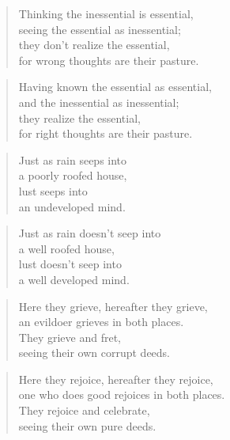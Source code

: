 \documentclass[12pt,openany]{book}%
\begin{document}
\begin{verse}%
Thinking the inessential is essential, \\
seeing the essential as inessential; \\
they don’t realize the essential, \\
for wrong thoughts are their pasture. 

%
\end{verse}

\begin{verse}%
Having known the essential as essential, \\
and the inessential as inessential; \\
they realize the essential, \\
for right thoughts are their pasture. 

%
\end{verse}

\begin{verse}%
Just as rain seeps into \\
a poorly roofed house, \\
lust seeps into \\
an undeveloped mind. 

%
\end{verse}

\begin{verse}%
Just as rain doesn’t seep into \\
a well roofed house, \\
lust doesn’t seep into \\
a well developed mind. 

%
\end{verse}

\begin{verse}%
Here they grieve, hereafter they grieve, \\
an evildoer grieves in both places. \\
They grieve and fret, \\
seeing their own corrupt deeds. 

%
\end{verse}

\begin{verse}%
Here they rejoice, hereafter they rejoice, \\
one who does good rejoices in both places. \\
They rejoice and celebrate, \\
seeing their own pure deeds. 

%
\end{verse}
\end{document}
